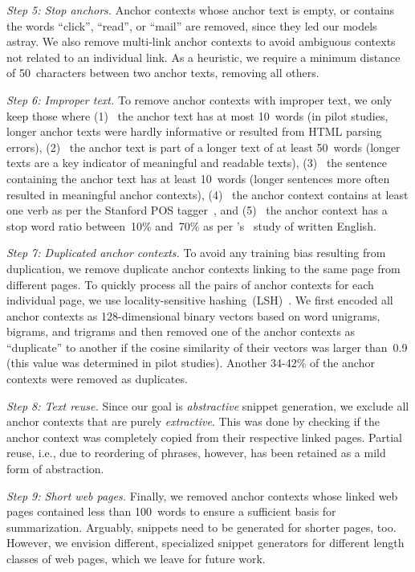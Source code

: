 \documentclass[sigconf]{acmart}
\newcommand{\Ni}{(1)~}
\newcommand{\Nii}{(2)~}
\newcommand{\Niii}{(3)~}
\newcommand{\Niv}{(4)~}
\newcommand{\Nv}{(5)~}
\newcommand{\bslabel}[1]{\textsl{#1.}}
\begin{document}
\enlargethispage{0.5\baselineskip}
\bslabel{Step 5: Stop anchors}
Anchor contexts whose anchor text is empty, or contains the words ``click'', ``read'', or ``mail'' are removed, since they led our models astray. We also remove multi-link anchor contexts to avoid ambiguous contexts not related to an individual link. As a heuristic, we require a minimum distance of 50~characters between two anchor texts, removing all others.

\bslabel{Step 6: Improper text}
To remove anchor contexts with improper text, we only keep those where
\Ni
the anchor text has at most 10~words (in pilot studies, longer anchor texts were hardly informative or resulted from HTML parsing errors),
\Nii
the anchor text is part of a longer text of at least 50~words (longer texts are a key indicator of meaningful and readable texts),
\Niii
the sentence containing the anchor text has at least 10~words (longer sentences more often resulted in meaningful anchor contexts),
\Niv
the anchor context contains at least one verb as per the Stanford POS tagger~\cite{toutanova:2003}, and
\Nv
the anchor context has a stop word ratio between~10\% and~70\% as per \citeauthor{biber:1999}'s~\cite{biber:1999} study of written English.

\bslabel{Step 7: Duplicated anchor contexts}
To avoid any training bias resulting from duplication, we remove duplicate anchor contexts linking to the same page from different pages. To quickly process all the pairs of anchor contexts for each individual page, we use locality-sensitive hashing~(LSH)~\cite{rao:2016}. We first encoded all anchor contexts as 128-dimensional binary vectors based on word unigrams, bigrams, and trigrams and then removed one of the anchor contexts as ``duplicate'' to another if the cosine similarity of their vectors was larger than~0.9 (this value was determined in pilot studies). Another 34-42\% of the anchor contexts were removed as duplicates.

\bslabel{Step 8: Text reuse}
Since our goal is {\em abstractive} snippet generation, we exclude all anchor contexts that are purely {\em extractive}. This was done by checking if the anchor context was completely copied from their respective linked pages. Partial reuse, i.e., due to reordering of phrases, however, has been retained as a mild form of abstraction.

\bslabel{Step 9: Short web pages}
Finally, we removed anchor contexts whose linked web pages contained less than 100~words to ensure a sufficient basis for summarization. Arguably, snippets need to be generated for shorter pages, too. However, we envision different, specialized snippet generators for different length classes of web pages, which we leave for future work.
\end{document}
